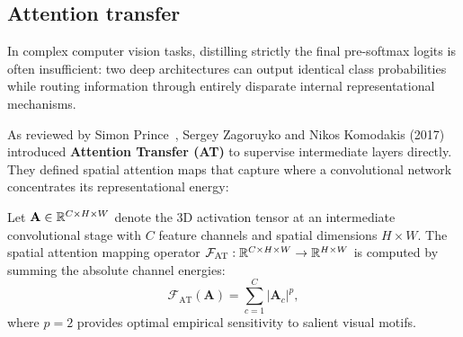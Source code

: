 \subsection{Attention transfer}
\label{sec:attention_transfer_distillation}

In complex computer vision tasks, distilling strictly the final pre-softmax logits is often insufficient: two deep architectures can output identical class probabilities while routing information through entirely disparate internal representational mechanisms.

As reviewed by Simon Prince~\cite{prince2023understanding}, Sergey Zagoruyko and Nikos Komodakis (2017)~\cite{zagoruyko2017paying} introduced \textbf{Attention Transfer (AT)} to supervise intermediate layers directly. They defined spatial attention maps that capture where a convolutional network concentrates its representational energy:

\begin{definition}
Let $\mathbf{A} \in \mathbb{R}^{C \times H \times W}$ denote the 3D activation tensor at an intermediate convolutional stage with $C$ feature channels and spatial dimensions $H \times W$. The spatial attention mapping operator $\mathcal{F}_{\text{AT}}: \mathbb{R}^{C \times H \times W} \to \mathbb{R}^{H \times W}$ is computed by summing the absolute channel energies:
\begin{equation}
\mathcal{F}_{\text{AT}}(\mathbf{A}) = \sum_{c=1}^C |\mathbf{A}_c|^p,
\label{eq:attention_map_definition}
\end{equation}
where $p = 2$ provides optimal empirical sensitivity to salient visual motifs.
\end{definition}

